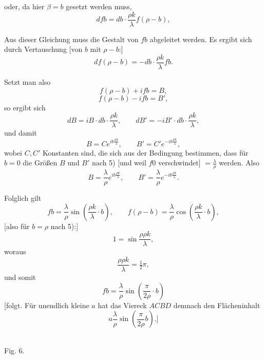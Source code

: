%
\noindent oder, da hier $\beta = b$ gesetzt werden muss,
\[
\tag*{7)} dfb = db\cdot\frac{\rho k}{\lambda} f(\rho-b),
\]

Aus dieser Gleichung muss die Gestalt von $fb$ abgeleitet werden. Es ergibt sich durch Vertauschung [von $b$ mit $\rho-b$:]
\[
\tag*{8)} df(\rho-b) = -db\cdot\frac{\rho k}{\lambda} fb.
\]

Setzt man also
\[
f(\rho-b) + ifb = B,
\]
\[
f(\rho-b) - ifb = B',
\]
so ergibt sich
\[
dB = iB\cdot db\cdot\frac{\rho k}{\lambda}, \qquad dB' = -iB'\cdot db\cdot\frac{\rho k}{\lambda},
\]
und damit
\[
B = Ce^{ib\frac{\rho k}{\lambda}}, \qquad B' = C'e^{-ib\frac{\rho k}{\lambda}},
\]
wobei $C, C'$ Konstanten sind, die sich aus der Bedingung bestimmen, dass für $b=0$ die Größen $B$ und $B'$ nach 5) [und weil $f0$ verschwindet] $=\frac{\lambda}{\rho}$ werden. Also
\[
B = \frac{\lambda}{\rho} e^{ib\frac{\rho k}{\lambda}}, \qquad B' = \frac{\lambda}{\rho} e^{-ib\frac{\rho k}{\lambda}}.
\]

Folglich gilt
\[
fb = \frac{\lambda}{\rho}\sin\left(\frac{\rho k}{\lambda}\cdot b\right), \qquad f(\rho-b) = \frac{\lambda}{\rho}\cos\left(\frac{\rho k}{\lambda}\cdot b\right),
\]
[also für $b=\rho$ nach 5):]
\[
1 = \sin\frac{\rho\rho k}{\lambda},
\]
woraus
\[
\frac{\rho\rho k}{\lambda} = \tfrac{1}{2}\pi,
\]
und somit
\[
fb = \frac{\lambda}{\rho}\sin\left(\frac{\pi}{2\rho}\cdot b\right)
\]
[folgt. Für unendlich kleine $a$ hat das Viereck $ACBD$ demnach den Flächeninhalt
\[
a\frac{\lambda}{\rho}\sin\left(\frac{\pi}{2\rho} b\right).]
\]

\begin{center}\begin{minipage}{\linewidth}\centering\\[3pt]Fig. 6.\end{minipage}\end{center}

